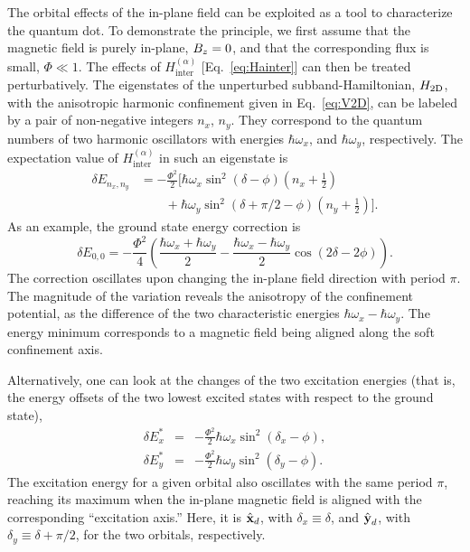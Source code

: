 \documentclass[aps,floatfix,twocolumn,showpacs,10pt,nofootinbib]{revtex4-1}
\newcommand{\be}{\begin{equation}}
\newcommand{\ee}{\end{equation}}
\begin{document}
The orbital effects of the in-plane field can be exploited as a tool to characterize the quantum dot. To demonstrate the principle, we first assume that the magnetic field is purely in-plane, $B_z=0$, and that the corresponding flux is small, $\Phi \ll 1$. The effects of $H_\textrm{inter}^{(\alpha)}$ [Eq.~\eqref{eq:Hainter}] can then be treated perturbatively. The eigenstates of the unperturbed subband-Hamiltonian, $H_{\rm 2D}$, with the anisotropic harmonic confinement given in Eq.~\eqref{eq:V2D}, can be labeled by a pair of non-negative integers $n_x$, $n_y$. They correspond to the quantum numbers of two harmonic oscillators with energies $\hbar \omega_x$, and $\hbar \omega_y$, respectively. The expectation value of $H_\textrm{inter}^{(\alpha)}$ in such an eigenstate is
\be
\begin{split}
\delta E_{n_x,n_y} & = - \frac{\Phi^2}{2} \Bigg[ \hbar \omega_x \sin^2(\delta-\phi)  \left( n_x+\frac{1}{2} \right)\\
&  \qquad +  \hbar \omega_y  \sin^2(\delta+\pi/2-\phi) \left( n_y+\frac{1}{2} \right) \Bigg].
\end{split}
\label{eq:dEnxny}
\ee
As an example, the ground state energy correction is
\be
\delta E_{0,0} = - \frac{\Phi^2}{4} \left( \frac{\hbar \omega_x +\hbar \omega_y}{2} - \frac{\hbar \omega_x -\hbar \omega_y}{2} \cos (2\delta-2\phi) \right).
\label{eq:dE00}
\ee
The correction oscillates upon changing the in-plane field direction with period $\pi$. The magnitude of the variation reveals the anisotropy of the confinement potential, as the difference of the two characteristic energies $\hbar \omega_x -\hbar \omega_y$. The energy minimum corresponds to a magnetic field being aligned along the soft confinement axis.

Alternatively, one can look at the changes of the two excitation energies (that is, the energy offsets of the two lowest excited states with respect to the ground state),
\begin{subequations}
\label{eq:dEstar}
\begin{eqnarray}
\delta E^*_x &=& -  \frac{\Phi^2}{2} \hbar \omega_x \sin^2(\delta_x-\phi), \\
\delta E^*_y &=& -  \frac{\Phi^2}{2} \hbar \omega_y \sin^2(\delta_y-\phi).
\end{eqnarray}
\end{subequations}
The excitation energy for a given orbital also oscillates with the same period $\pi$, reaching its maximum when the in-plane magnetic field is aligned with the corresponding ``excitation axis.'' Here, it is $\hat{\textbf{x}}_d$, with $\delta_x\equiv \delta$, and $\hat{\textbf{y}}_d$, with $\delta_y\equiv \delta+\pi/2$, for the two orbitals, respectively.
\end{document}
